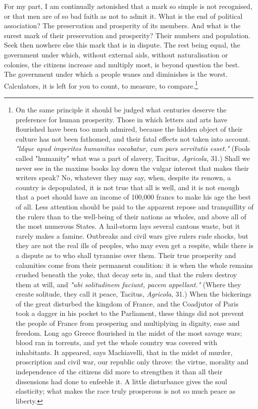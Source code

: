 \documentclass[12pt]{book}
\begin{document}
For my part, I am continually astonished that a mark so simple is not recognised, or that men are of so bad faith as not to admit it. What is the end of political association? The preservation and prosperity of its members. And what is the surest mark of their preservation and prosperity? Their numbers and population. Seek then nowhere else this mark that is in dispute. The rest being equal, the government under which, without external aids, without naturalisation or colonies, the citizens increase and multiply most, is beyond question the best. The government under which a people wanes and diminishes is the worst. Calculators, it is left for you to count, to measure, to compare.\footnote{On the same principle it should be judged what centuries deserve the preference for human prosperity. Those in which letters and arts have flourished have been too much admired, because the hidden object of their culture has not been fathomed, and their fatal effects not taken into account. \textit{"ldque apud imperitos humanitas vocabatur, cum pars servitutis esset."} (Fools called "humanity" what was a part of slavery, Tacitus, \textit{Agricola}, 31.) Shall we never see in the maxims books lay down the vulgar interest that makes their writers speak? No, whatever they may say, when, despite its renown, a country is depopulated, it is not true that all is well, and it is not enough that a poet should have an income of 100,000 francs to make his age the best of all. Less attention should be paid to the apparent repose and tranquillity of the rulers than to the well-being of their nations as wholes, and above all of the most numerous States. A hail-storm lays several cantons waste, but it rarely makes a famine. Outbreaks and civil wars give rulers rude shocks, but they are not the real ills of peoples, who may even get a respite, while there is a dispute as to who shall tyrannise over them. Their true prosperity and calamities come from their permanent condition: it is when the whole remains crushed beneath the yoke, that decay sets in, and that the rulers destroy them at will, and \textit{"ubi solitudinem faciunt, pacem appellant."} (Where they create solitude, they call it peace, Tacitus, \textit{Agricola}, 31.) When the bickerings of the great disturbed the kingdom of France, and the Coadjutor of Paris took a dagger in his pocket to the Parliament, these things did not prevent the people of France from prospering and multiplying in dignity, ease and freedom. Long ago Greece flourished in the midst of the most savage wars; blood ran in torrents, and yet the whole country was covered with inhabitants. It appeared, says Machiavelli, that in the midst of murder, proscription and civil war, our republic only throve: the virtue, morality and independence of the citizens did more to strengthen it than all their dissensions had done to enfeeble it. A little disturbance gives the soul elasticity; what makes the race truly prosperous is not so much peace as liberty.}
\end{document}
